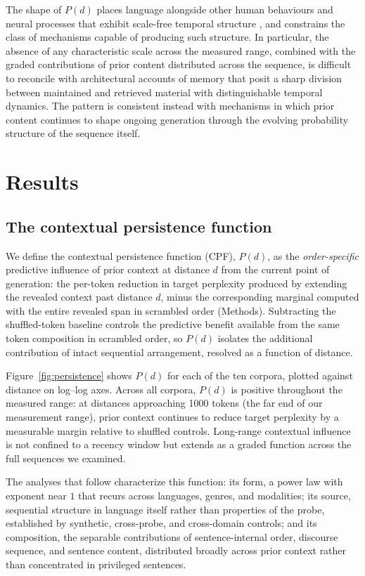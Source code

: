 \documentclass[11pt]{article}
\begin{document}
The shape of $P(d)$ places language alongside other human behaviours and neural
processes that exhibit scale-free temporal structure \citep{gilden2001cognitive, barabasi2005origin, linkenkaerhansen2001longrange, beggs2003neuronal, kello2010scaling}, and constrains the class of
mechanisms capable of producing such structure. In particular, the absence of any
characteristic scale across the measured range, combined with the graded
contributions of prior content distributed across the sequence, is difficult to
reconcile with architectural accounts of memory that posit a sharp division between
maintained and retrieved material with distinguishable temporal dynamics. The pattern
is consistent instead with mechanisms in which prior content continues to shape
ongoing generation through the evolving probability structure of the sequence itself.

\section{Results}

\subsection{The contextual persistence function}

We define the contextual persistence function (CPF), $P(d)$, as the \emph{order-specific}
predictive influence of prior context at distance $d$ from the current point of generation:
the per-token reduction in target perplexity produced by extending the revealed context past
distance $d$, minus the corresponding marginal computed with the entire revealed span in scrambled
order (Methods). Subtracting the
shuffled-token baseline controls the predictive benefit available from the same token composition in
scrambled order, so $P(d)$ isolates the additional contribution of intact sequential arrangement,
resolved as a function of distance.

Figure~\ref{fig:persistence} shows $P(d)$ for each of the ten corpora, plotted against distance
on log--log axes. Across all corpora, $P(d)$ is positive throughout the measured range: at
distances approaching 1000 tokens (the far end of our measurement range), prior context continues
to reduce target perplexity by a measurable margin relative to shuffled controls. Long-range
contextual influence is not confined to a recency window but extends as a graded function across
the full sequences we examined.

The analyses that follow characterize this function: its form, a power law with exponent near
$1$ that recurs across languages, genres, and modalities; its source, sequential structure in
language itself rather than properties of the probe, established by synthetic, cross-probe, and
cross-domain controls; and its composition, the separable contributions of sentence-internal
order, discourse sequence, and sentence content, distributed broadly across prior context rather
than concentrated in privileged sentences.
\end{document}
